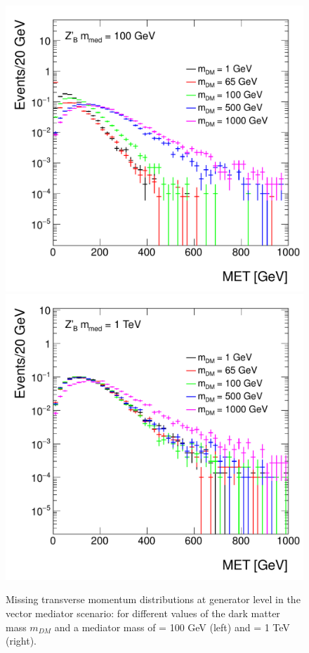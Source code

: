 \begin{figure}[hbpt!]
	\includegraphics[width=0.49\linewidth]{figures/EW/monoH/zprime_100_MET_et_Log}
	\includegraphics[width=0.49\linewidth]{figures/EW/monoH/zprime_1000_MET_et_Log}
	\caption{Missing transverse momentum distributions at generator level in the vector 
		mediator scenario: for different values of the dark matter mass $m_{DM}$ 
		and a mediator mass of \mmed = 100 GeV (left) and \mmed = 1 TeV (right).
		\label{fig:metVectorMass} }
\end{figure}


